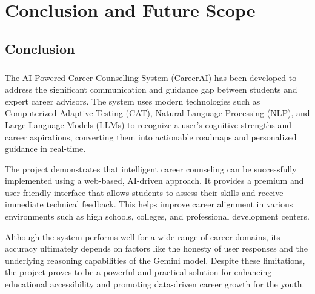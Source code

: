 \chapter{Conclusion and Future Scope}
\section{Conclusion}
\paragraph{}The AI Powered Career Counselling System (CareerAI) has been developed to address the significant communication and guidance gap between students and expert career advisors. The system uses modern technologies such as Computerized Adaptive Testing (CAT), Natural Language Processing (NLP), and Large Language Models (LLMs) to recognize a user's cognitive strengths and career aspirations, converting them into actionable roadmaps and personalized guidance in real-time.

The project demonstrates that intelligent career counseling can be successfully implemented using a web-based, AI-driven approach. It provides a premium and user-friendly interface that allows students to assess their skills and receive immediate technical feedback. This helps improve career alignment in various environments such as high schools, colleges, and professional development centers.

Although the system performs well for a wide range of career domains, its accuracy ultimately depends on factors like the honesty of user responses and the underlying reasoning capabilities of the Gemini model. Despite these limitations, the project proves to be a powerful and practical solution for enhancing educational accessibility and promoting data-driven career growth for the youth.

